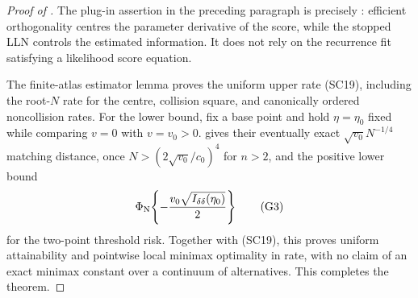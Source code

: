 \begin{proof}[Proof of ]
The plug-in assertion in the preceding paragraph is precisely
: efficient orthogonality centres the
parameter derivative of the score, while the stopped LLN controls the
estimated information.  It does not rely on the recurrence fit satisfying a
likelihood score equation.

The finite-atlas estimator lemma proves the uniform upper rate
\textup{(SC19)}, including the root-\(N\) rate for the centre, collision
square, and canonically ordered noncollision rates.  For the lower bound, fix
a base point and hold \(\eta=\eta_0\) fixed while comparing \(v=0\) with
\(v=v_0>0\).   gives their eventually
exact \(\sqrt{v_0}N^{-1/4}\) matching distance, once
\(N>(2\sqrt{v_0}/c_0)^4\) for \(n>2\), and the positive lower bound
\[
 \Phi_{\rm N}\!\left\{
 -\frac{v_0\sqrt{I_{\delta\delta}(\eta_0)}}2\right\}
\tag{G3}
\]
for the two-point threshold risk.  Together with \textup{(SC19)}, this proves
uniform attainability and pointwise local minimax optimality in rate, with no
claim of an exact minimax constant over a continuum of alternatives.  This
completes the theorem.
\end{proof}
